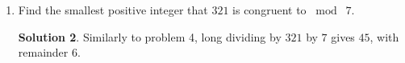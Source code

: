 \documentclass{article}
\theoremstyle{definition}
\newtheorem*{solution}{Solution}
\begin{document}
\begin{multicols}{2}
\begin{enumerate}
            \begin{solution}
                We could try to subtract out all the $4$'s: $123$, $119$, $115$...
                However, the easiest way is to get rid of all the $4$'s at once, dividing by $4$ and keeping only the remainder.
                Long dividing $123$ by $4$ gives $30$, with remainder $3$.
            \end{solution}
        \item Find the smallest positive integer that $321$ is congruent to $\bmod \; 7$.
            \begin{solution}
                Similarly to problem 4, long dividing by $321$ by $7$ gives $45$, with remainder $6$.
            \end{solution}
    \end{enumerate}
\end{multicols}
\end{document}
